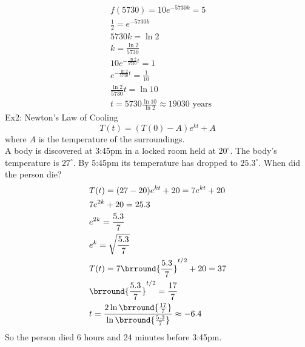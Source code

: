 \begin{align*}
    &f(5730)=10e^{-5730k}=5\\
    &\frac{1}{2}=e^{-5730k}\\
    &5730k=\ln 2\\
    &k=\frac{\ln 2}{5730}\\
    &10e^{-\frac{\ln 2}{5730}t}=1\\
    &e^{-\frac{\ln 2}{5730}t}=\frac{1}{10}\\
    &\frac{\ln 2}{5730}t=\ln10\\
    &t=5730\frac{\ln10}{\ln2}\approx19030\text{ years}
\end{align*}
Ex2: Newton's Law of Cooling
$$T(t)=(T(0)-A)e^{kt}+A$$
where $A$ is the temperature of the surroundings.\\
A body is discovered at 3:45pm in a locked room held at $20^\circ$. The body's temperature is $27^\circ$. By 5:45pm its temperature has dropped to $25.3^\circ$. When did the person die?
\begin{align*}
    &T(t)=(27-20)e^{kt}+20=7e^{kt}+20\\
    &7e^{2k}+20=25.3\\
    &e^{2k}=\frac{5.3}{7}\\
    &e^k=\sqrt{\frac{5.3}{7}}\\
    &T(t)=7\brround{\frac{5.3}{7}}^{t/2}+20=37\\
    &\brround{\frac{5.3}{7}}^{t/2}=\frac{17}{7}\\
    &t=\frac{2\ln\brround{\frac{17}{7}}}{\ln\brround{\frac{5.3}{7}}}\approx-6.4
\end{align*}
So the person died 6 hours and 24 minutes before 3:45pm.
